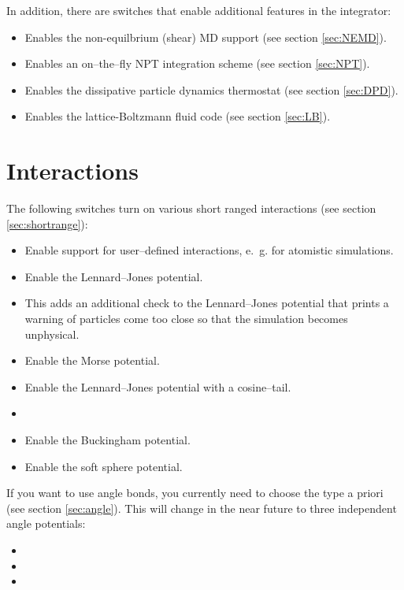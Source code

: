 In addition, there are switches that enable additional features in the integrator:
\begin{itemize}
\item {} Enables the non-equilbrium (shear) MD support (see section \vref{sec:NEMD}).
\item {} Enables an on--the--fly NPT integration scheme (see section \vref{sec:NPT}).
\item {} Enables the dissipative particle dynamics thermostat (see
  section \vref{sec:DPD}).
\item {} Enables the lattice-Boltzmann fluid code (see section \vref{sec:LB}).
\end{itemize}

\section{Interactions}

The following switches turn on various short ranged interactions (see section
\vref{sec:shortrange}):
\begin{itemize}
\item {} Enable support for user--defined interactions, e.~g. for atomistic
  simulations.
\item {} Enable the Lennard--Jones potential.
\item {} This adds an additional check to the Lennard--Jones
  potential that prints a warning of particles come too close so that the simulation becomes
  unphysical.
\item {} Enable the Morse potential.
\item {} Enable the Lennard--Jones potential with a cosine--tail.
\item {}
\item {} Enable the Buckingham potential.
\item {} Enable the soft sphere potential.
\end{itemize}

If you want to use angle bonds, you currently need to choose the type
a priori (see section \vref{sec:angle}). This will change in the near
future to three independent angle potentials:
\begin{itemize}
\item {}
\item {}
\item {}
\end{itemize}

